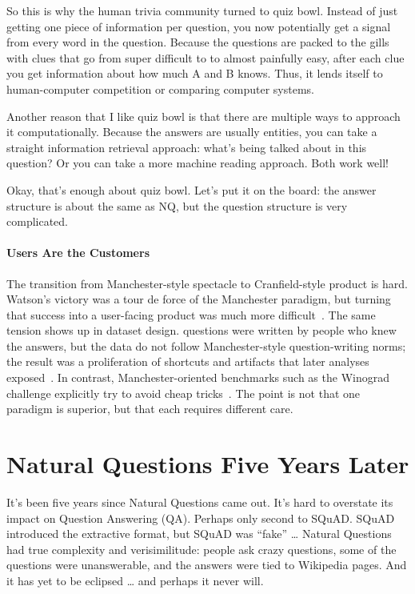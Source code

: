 So this is why the human trivia community turned to quiz bowl. Instead of just getting one piece of information per question, you now potentially get a signal from every word in the question. Because the questions are packed to the gills with clues that go from super difficult to to almost painfully easy, after each clue you get information about how much A and B knows. Thus, it lends itself to human-computer competition or comparing computer systems.

Another reason that I like quiz bowl is that there are multiple ways to approach it computationally. Because the answers are usually entities, you can take a straight information retrieval approach: what’s being talked about in this question? Or you can take a more machine reading approach. Both work well!

Okay, that’s enough about quiz bowl. Let’s put it on the board: the answer structure is about the same as NQ, but the question structure is very complicated.



\paragraph{Users Are the Customers}
%
The transition from Manchester-style spectacle to Cranfield-style product is
hard.  Watson's \jeopardy{} victory was a tour de force of the
Manchester paradigm, but turning that success into a user-facing product was
much more difficult~\citep{chu2002piquant,deutscher-21,jennings2011ibm}. The
same tension shows up in dataset design. \squad{} questions were written by
people who knew the answers, but the data do not follow Manchester-style
question-writing norms; the result was a proliferation of shortcuts and
artifacts that later analyses exposed~\citep{weissenborn-17}. In
contrast, Manchester-oriented benchmarks such as the Winograd challenge
explicitly try to avoid cheap tricks~\citep{levesque2014behavior}. The point is
not that one paradigm is superior, but that each requires different care.



\section{Natural Questions Five Years Later}
\label{sec:nq:problems}

It’s been five years since Natural Questions came out.  It’s hard to overstate its impact on Question Answering (QA).  Perhaps only second to SQuAD.  SQuAD introduced the extractive format, but SQuAD was “fake” … Natural Questions had true complexity and verisimilitude: people ask crazy questions, some of the questions were unanswerable, and the answers were tied to Wikipedia pages.  And it has yet to be eclipsed … and perhaps it never will.  

